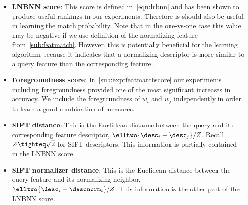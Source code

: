             \begin{itemize}
                \item \textbf{LNBNN score}:
                    This score is defined in~\cref{eqn:lnbnn} and has been
                      shown to produce useful rankings in our experiments.
                    Therefore is should also be useful in learning the match
                      probability.
                    Note that in the one-vs-one case this value may be
                      negative if we use definition of the normalizing feature
                      from~\cref{sub:featmatch}.
                    However, this is potentially beneficial for the learning
                      algorithm because it indicates that a normalizing
                      descriptor is more similar to a query feature than the
                      corresponding feature.

                \item \textbf{Foregroundness score}:
                    In~\cref{sub:exptfeatmatchscore} our experiments including
                      foregroundness provided one of the most significant
                      increases in accuracy.
                    We include the foregroundness of $w_i$ and $w_j$
                      independently in order to learn a good combination of
                      measures.

                \item \textbf{SIFT \correspondence{} distance}:
                    This is the Euclidean distance between the query and its
                      corresponding feature descriptor, $\elltwo{\desc_i -
                      \desc_j} / Z$.
                    Recall $Z\tighteq\sqrt{2}$ for SIFT descriptors.
                    This information is partially contained in the LNBNN
                      score.

                \item \textbf{SIFT normalizer distance}:
                    This is the Euclidean distance between the query feature
                      and its normalizing neighbor, $\elltwo{\desc_i -
                      \descnorm_{i}} / Z$.
                    This information is the other part of the LNBNN score.


\end{itemize}
